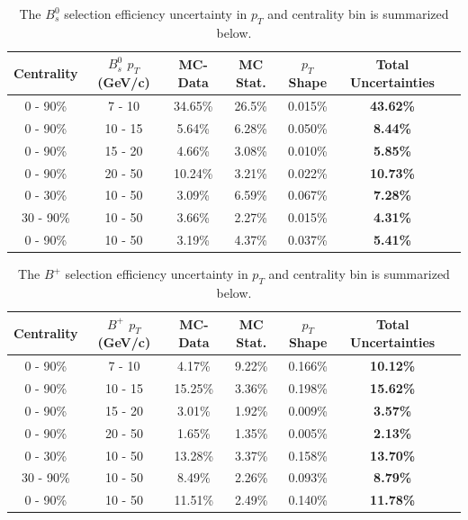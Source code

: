 \begin{table}[h]
\begin{center}
\caption{The $B^0_s$ selection efficiency uncertainty in $p_T$ and centrality bin is summarized below.}
\vspace{1em}
\label{BsPTShape}
  \begin{tabular}{| c | c |c | c| c| c| c| }
    \hline
     Centrality & $B^0_s$ $p_T$ (GeV/c) & MC-Data  & MC Stat. & $p_T$ Shape & Total Uncertainties \\
    \hline
    \hline
0 - 90\% & 7 - 10 &   34.65\%  &  26.5\% & 0.015\% &  \textbf{43.62\%} \\ 
0 - 90\% & 10 - 15 & 5.64\%  & 6.28\%  & 0.050\% &   \textbf{8.44\%}  \\ 
0 - 90\% & 15 - 20 &  4.66\%   & 3.08\%   &  0.010\% &  \textbf{5.85\%} \\ 
0 - 90\% & 20 - 50 &  10.24\%   & 3.21\%  &  0.022\%  &   \textbf{10.73\%}\\ 
0 - 30\% & 10 - 50  & 3.09\%  & 6.59\%  & 0.067\% &  \textbf{7.28\%} \\ 
30 - 90\% & 10 - 50 &  3.66\% &   2.27\%  & 0.015\% &  \textbf{4.31\%} \\ 
0 - 90\% & 10 - 50 & 3.19\%   & 4.37\%  & 0.037\% &   \textbf{5.41\%} \\ 
    \hline
    \hline
\end{tabular}
\end{center}
\end{table}



\begin{table}[h]
\begin{center}
\caption{The $B^+$ selection efficiency uncertainty in $p_T$ and centrality bin is summarized below.}
\vspace{1em}
\label{BsPTShape}
  \begin{tabular}{| c | c |c | c| c| c| c| }
    \hline
     Centrality & $B^+$ $p_T$ (GeV/c) & MC-Data  & MC Stat. & $p_T$ Shape & Total Uncertainties \\
    \hline
    \hline
0 - 90\% & 7 - 10 &   4.17\%  &  9.22\% & 0.166\% &  \textbf{10.12\%} \\ 
0 - 90\% & 10 - 15 & 15.25\%  & 3.36\%  & 0.198\% &   \textbf{15.62\%}  \\ 
0 - 90\% & 15 - 20 &  3.01\%   & 1.92\%   & 0.009\% &  \textbf{3.57\%} \\ 
0 - 90\% & 20 - 50 &  1.65\%   & 1.35\%  &  0.005\%  &   \textbf{2.13\%}\\ 
0 - 30\% & 10 - 50  & 13.28\%  & 3.37\%  &0.158\% &  \textbf{13.70\%} \\ 
30 - 90\% & 10 - 50 &  8.49\% &   2.26\%  & 0.093\% &  \textbf{8.79\%} \\ 
0 - 90\% & 10 - 50 & 11.51\%   & 2.49\%  & 0.140\% &   \textbf{11.78\%} \\ 
    \hline
    \hline
\end{tabular}
\end{center}
\end{table}



